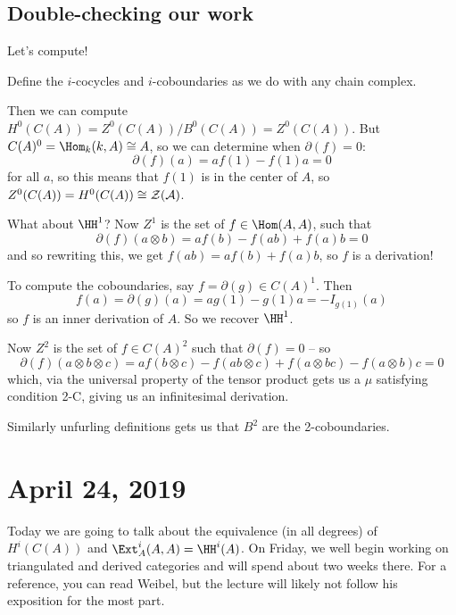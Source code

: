 \documentclass[12pt]{article}
\begin{document}
\subsection{Double-checking our work}
Let's compute! 
\begin{defn}
	Define the $i$-cocycles and $i$-coboundaries as we do with any chain complex.
\end{defn}
Then we can compute $H^0(C(A))=Z^0(C(A))/B^0(C(A))=Z^0(C(A))$. But $C(A)^0=\Hom_k(k,A)\cong A$, 
so we can determine when $\partial(f)=0$:
\[\partial(f)(a)=af(1)-f(1)a=0\]
for all $a$, so this means that $f(1)$ is in the center of $A$, so $Z^0(C(A))=H^0(C(A))\cong\cal Z(A)$.

\brk

What about $\HH^1$? Now $Z^1$ is the set of $f\in \Hom(A,A)$, such that
\[\partial(f)(a\otimes b)=af(b)-f(ab)+f(a)b=0\]
and so rewriting this, we get $f(ab)=af(b)+f(a)b$, so $f$ is a derivation!

To compute the coboundaries, say $f=\partial(g)\in C(A)^1$. Then 
\[f(a)=\partial(g)(a)=ag(1)-g(1)a=-I_{g(1)}(a)\]
so $f$ is an inner derivation of $A$. So we recover $\HH^1$.

\brk

Now $Z^2$ is the set of $f\in C(A)^2$ such that $\partial(f)=0$ -- so
\[\partial(f)(a\otimes b\otimes c)=af(b\otimes c)-f(ab\otimes c)+f(a\otimes bc)-f(a\otimes b)c=0\]
which, via the universal property of the tensor product gets us a $\mu$ satisfying condition 2-C, giving us
an infinitesimal derivation.

Similarly unfurling definitions gets us that $B^2$ are the 2-coboundaries.

\section{April 24, 2019}
Today we are going to talk about the equivalence (in all degrees) of $H^i(C(A))$ and $\Ext_A^i(A,A)=\HH^i(A)$.
On Friday, we well begin working on triangulated and derived categories and will spend about two weeks there. 
For a reference, you can read Weibel, but the lecture will likely not follow his exposition for the most part.
\end{document}
